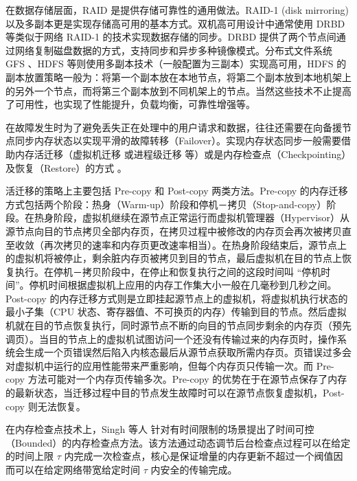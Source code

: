 在数据存储层面，RAID \cite{Patterson:1988:CRA:50202.50214} 是提供存储可靠性的通用做法。RAID-1 (disk mirroring) 以及多副本更是实现存储高可用的基本方式。双机高可用设计中通常使用 DRBD \cite{DRBD:2015} 等类似于网络 RAID-1 的技术实现数据存储的同步。DRBD 提供了两个节点间通过网络复制磁盘数据的方式，支持同步和异步多种镜像模式。分布式文件系统 GFS \cite{Ghemawat:2003:GFS:945445.945450}、HDFS \cite{hadoop:2014} 等则使用多副本技术（一般配置为三副本）实现高可用，HDFS 的副本放置策略一般为：将第一个副本放在本地节点，将第二个副本放到本地机架上的另外一个节点，而将第三个副本放到不同机架上的节点。当然这些技术不止提高了可用性，也实现了性能提升，负载均衡，可靠性增强等。

在故障发生时为了避免丢失正在处理中的用户请求和数据，往往还需要在向备援节点同步内存状态以实现平滑的故障转移（Failover）。实现内存状态同步一般需要借助内存活迁移（虚拟机迁移 \cite{Clark:2005:LMV:1251203.1251223} 或进程级迁移 \cite{Wang:2008:PPL:1413370.1413414} 等）或是内存检查点（Checkpointing）及恢复（Restore）的方式 \cite{Duell03thedesign, CRIU:2016}。

活迁移的策略上主要包括 Pre-copy 和 Post-copy 两类方法。Pre-copy 的内存迁移方式包括两个阶段：热身（Warm-up）阶段和停机－拷贝（Stop-and-copy）阶段。在热身阶段，虚拟机继续在源节点正常运行而虚拟机管理器（Hypervisor）从源节点向目的节点拷贝全部内存页，在拷贝过程中被修改的内存页会再次被拷贝直至收敛（再次拷贝的速率和内存页更改速率相当）。在热身阶段结束后，源节点上的虚拟机将被停止，剩余脏内存页被拷贝到目的节点，最后虚拟机在目的节点上恢复执行。在停机－拷贝阶段中，在停止和恢复执行之间的这段时间叫 ``停机时间''。停机时间根据虚拟机上应用的内存工作集大小一般在几毫秒到几秒之间。Post-copy 的内存迁移方式则是立即挂起源节点上的虚拟机，将虚拟机执行状态的最小子集（CPU 状态、寄存器值、不可换页的内存）传输到目的节点。然后虚拟机就在目的节点恢复执行，同时源节点不断的向目的节点同步剩余的内存页（预先调页）。当目的节点上的虚拟机试图访问一个还没有传输过来的内存页时，操作系统会生成一个页错误然后陷入内核态最后从源节点获取所需内存页。页错误过多会对虚拟机中运行的应用性能带来严重影响，但每个内存页只传输一次。而 Pre-copy 方法可能对一个内存页传输多次。Pre-copy 的优势在于在源节点保存了内存的最新状态，当迁移过程中目的节点发生故障时可以在源节点恢复虚拟机，Post-copy 则无法恢复。

在内存检查点技术上，Singh 等人 \cite{Singh:2013:YEG:2482626.2482642} 针对有时间限制的场景提出了时间可控（Bounded）的内存检查点方法。该方法通过动态调节后台检查点过程可以在给定的时间上限 $\tau$ 内完成一次检查点，核心是保证增量的内存更新不超过一个阀值因而可以在给定网络带宽给定时间 $\tau$ 内安全的传输完成。

